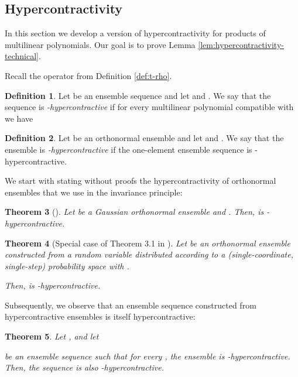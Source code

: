 \documentclass{daj}
\newcommand{\1}{\mathbbm{1}}
\theoremstyle{plain}
\newtheorem{theorem}{Theorem}[section]
\theoremstyle{definition}
\newtheorem{definition}[theorem]{Definition}
\begin{document}
\subsection{Hypercontractivity}
\label{sec:hyper}

In this section we develop a version of hypercontractivity for products
of multilinear polynomials. Our goal is to prove Lemma
\ref{lem:hypercontractivity-technical}.

Recall the operator  from Definition \ref{def:t-rho}.

\begin{definition}
Let  be an ensemble sequence
and let  and .
We say that the sequence  is
\emph{-hypercontractive} if for
every multilinear polynomial  compatible with 
we have

\end{definition}

\begin{definition}
Let  be an orthonormal ensemble
and let  and .
We say that the ensemble  is
\emph{-hypercontractive} if
the one-element ensemble sequence
 is
-hypercontractive.
\end{definition}

We start with stating without proofs the hypercontractivity of
orthonormal ensembles that we use in
the invariance principle:

\begin{theorem}[\cite{Bon70, Nel73, Gro75, Bec75}]
\label{thm:hypercontractivity-single-gauss}
Let  be a Gaussian orthonormal
ensemble and . Then,
 is -hypercontractive.
\end{theorem}

\begin{theorem}[Special case of Theorem 3.1 in \cite{Wol07}]
\label{thm:hypercontractivity-single-discrete}
Let  be an orthonormal ensemble constructed from a random variable
 distributed according to a 
(single-coordinate, single-step) probability space 
 with 
.

Then,  is -hypercontractive.
\end{theorem}

Subsequently, we observe that
an ensemble sequence constructed from
hypercontractive ensembles is itself hypercontractive:

\begin{theorem}
\label{thm:tensorization}
Let ,  and let

be an ensemble sequence such that
for every , the ensemble 
is -hypercontractive. Then,
the sequence  is also
-hypercontractive.
\end{theorem}
\end{document}
